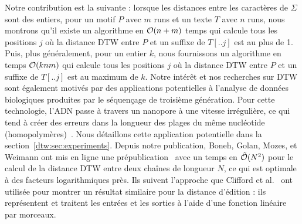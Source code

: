 Notre contribution est la suivante : lorsque les distances entre les caractères de $\Sigma$ sont des entiers, pour un motif $P$ avec $m$ runs et un texte $T$ avec $n$ runs, nous montrons qu'il existe un algorithme en $\mathcal{O}(n+m)$ temps qui calcule tous les positions $j$ où la distance DTW entre $P$ et un suffixe de $T[..j]$ est au plus de 1. Puis, plus généralement, pour un entier $k$, nous fournissons un algorithme en temps $\mathcal{O}(knm)$ qui calcule tous les positions $j$ où la distance DTW entre $P$ et un suffixe de $T[..j]$ est au maximum de $k$.
Notre intérêt et nos recherches sur DTW sont également motivés par des applications potentielles à l'analyse de données biologiques produites par le séquençage de troisième génération. Pour cette technologie,  l'ADN passe à travers un nanopore à une vitesse irrégulière, ce qui tend à créer des erreurs dans la longueur des plages du même nucléotide (homopolymères)~\cite{delahaye2021sequencing}. Nous détaillons cette application potentielle dans la section~\ref{dtw:sec:experiments}.
Depuis notre publication, Boneh, Golan, Mozes, et Weimann ont mis en ligne une prépublication~\cite{boneh2023near} avec un temps en $\tilde{\mathcal{O}}(N^2)$ pour le calcul de la distance DTW entre deux chaînes de longueur $N$, ce qui est optimale à des facteurs logarithmiques près. Ils suivent l'approche que Clifford et al.~\cite{clifford2019rle} ont utilisée pour montrer un résultat similaire pour la distance d'édition : ils représentent et traitent les entrées et les sorties à l'aide d'une fonction linéaire par morceaux.\\

